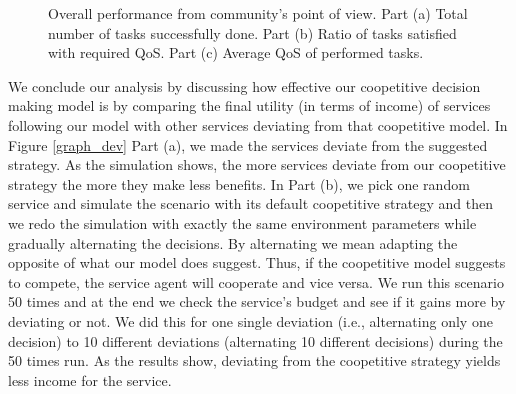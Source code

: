 \begin{figure}[h]
\caption{Overall performance from community's point of view. Part
(a) Total number of tasks successfully done. Part (b) Ratio of
tasks satisfied with required QoS. Part (c) Average QoS of
performed tasks.} \label{graph_task}
\end{figure}


We conclude our analysis by discussing how effective our
coopetitive decision making model is by comparing the final
utility (in terms of income) of services following our model with
other services deviating from that coopetitive model. In Figure
\ref{graph_dev} Part (a), we made the services deviate from the
suggested strategy. As the simulation shows, the more services
deviate from our coopetitive strategy the more they make less
benefits. In Part (b), we pick one random service and simulate the
scenario with its default coopetitive strategy and then we redo
the simulation with exactly the same environment parameters while
gradually alternating the decisions. By alternating we mean
adapting the opposite of what our model does suggest. Thus, if the
coopetitive model suggests to compete, the service agent will
cooperate and vice versa. We run this scenario 50 times and at the
end we check the service's budget and see if it gains more by
deviating or not. We did this for one single deviation (i.e.,
alternating only one decision) to 10 different deviations
(alternating 10 different decisions) during the 50 times run. As
the results show, deviating from the coopetitive strategy yields
less income for the service.

